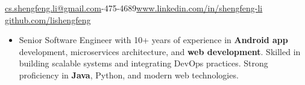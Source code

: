 \documentclass[10pt,a4paper]{article}
\begin{document}
\sloppy  %



\nobreakvspace{0.3em}  %

\noindent\href{mailto:cs.shengfeng.li@gmail.com}{cs.shengfeng.li@gmail.com}-475-4689\sbull\href{https://www.linkedin.com/in/shengfeng-li/}{www.linkedin.com/in/shengfeng-li}\sbull
\href{https://github.com/lishengfeng}{github.com/lishengfeng}

\spacedhrule{0em}{-1em}  %
\begin{itemize}
\setlength{\itemsep}{0.1em}
\item Senior Software Engineer with 10+ years of experience in \textbf{Android app} development, microservices architecture, and \textbf{web development}. Skilled in building scalable systems and integrating DevOps practices. Strong proficiency in \textbf{Java}, Python, and modern web technologies.
\end{itemize}



\end{document}
